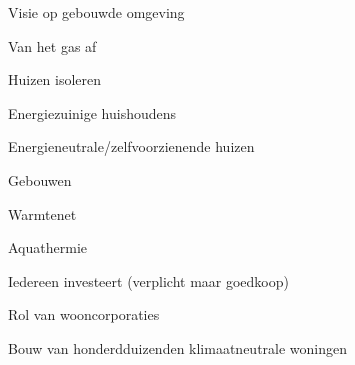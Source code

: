 
\begin{voorstel}{Visie op gebouwde omgeving}\end{voorstel}

\begin{voorstel}{Van het gas af}\end{voorstel}
\begin{voorstel}{Huizen isoleren}\end{voorstel}
\begin{voorstel}{Energiezuinige huishoudens}\end{voorstel}
\begin{voorstel}{Energieneutrale/zelfvoorzienende huizen}\end{voorstel}
\begin{voorstel}{Gebouwen}\end{voorstel}
\begin{voorstel}{Warmtenet}\end{voorstel}
\begin{voorstel}{Aquathermie}\end{voorstel}
\begin{voorstel}{Iedereen investeert (verplicht maar goedkoop)}\end{voorstel}
\begin{voorstel}{Rol van wooncorporaties}\end{voorstel}
\begin{voorstel}{Bouw van honderdduizenden klimaatneutrale woningen}\end{voorstel}
 